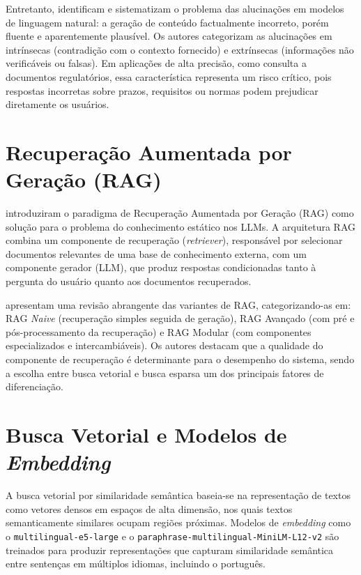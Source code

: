 \documentclass[
  12pt,
  openright,
  twoside,
  a4paper,
  brazil
]{abntex2}
\begin{document}
Entretanto,  identificam e sistematizam o problema das alucinações em modelos de linguagem natural: a geração de conteúdo factualmente incorreto, porém fluente e aparentemente plausível. Os autores categorizam as alucinações em intrínsecas (contradição com o contexto fornecido) e extrínsecas (informações não verificáveis ou falsas). Em aplicações de alta precisão, como consulta a documentos regulatórios, essa característica representa um risco crítico, pois respostas incorretas sobre prazos, requisitos ou normas podem prejudicar diretamente os usuários.

\section{Recuperação Aumentada por Geração (RAG)}

 introduziram o paradigma de Recuperação Aumentada por Geração (RAG) como solução para o problema do conhecimento estático nos LLMs. A arquitetura RAG combina um componente de recuperação (\textit{retriever}), responsável por selecionar documentos relevantes de uma base de conhecimento externa, com um componente gerador (LLM), que produz respostas condicionadas tanto à pergunta do usuário quanto aos documentos recuperados.

 apresentam uma revisão abrangente das variantes de RAG, categorizando-as em: RAG \textit{Naive} (recuperação simples seguida de geração), RAG Avançado (com pré e pós-processamento da recuperação) e RAG Modular (com componentes especializados e intercambiáveis). Os autores destacam que a qualidade do componente de recuperação é determinante para o desempenho do sistema, sendo a escolha entre busca vetorial e busca esparsa um dos principais fatores de diferenciação.

\section{Busca Vetorial e Modelos de \textit{Embedding}}

A busca vetorial por similaridade semântica baseia-se na representação de textos como vetores densos em espaços de alta dimensão, nos quais textos semanticamente similares ocupam regiões próximas. Modelos de \textit{embedding} como o \texttt{multilingual-e5-large} \cite{wang2022text} e o \texttt{paraphrase-multilingual-MiniLM-L12-v2} \cite{reimers2019sentence} são treinados para produzir representações que capturam similaridade semântica entre sentenças em múltiplos idiomas, incluindo o português.
\end{document}
